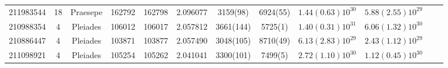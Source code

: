 \begin{tabular}{lccccccccccr}
 211983544 &  18 &  Praesepe &  162792 &  162798 &   2.096077 &             3159(98) &    6924(55) &        $1.44(0.63)10^{30}$ &     $5.88(2.55)10^{29}$ \\
 210988354 &   4 &  Pleiades &  106012 &  106017 &   2.057812 &            3661(144) &     5725(1) &        $1.40(0.31)10^{31}$ &     $6.06(1.32)10^{30}$ \\
 210886447 &   4 &  Pleiades &  103871 &  103877 &   2.057490 &            3048(105) &    8710(49) &        $6.13(2.83)10^{29}$ &     $2.43(1.12)10^{29}$ \\
 211098921 &   4 &  Pleiades &  105254 &  105262 &   2.041041 &            3300(101) &     7499(5) &        $2.72(1.10)10^{30}$ &     $1.12(0.45)10^{30}$ \\
\hline

\end{tabular}
